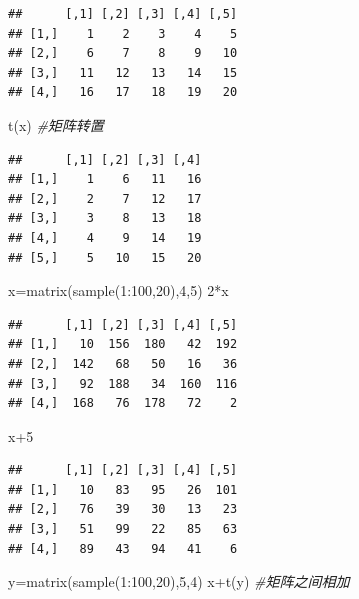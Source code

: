 \documentclass[
]{book}
\newenvironment{Shaded}{\begin{snugshade}}{\end{snugshade}}
\newcommand{\CommentTok}[1]{\textcolor[rgb]{0.56,0.35,0.01}{\textit{#1}}}
\newcommand{\DecValTok}[1]{\textcolor[rgb]{0.00,0.00,0.81}{#1}}
\newcommand{\FunctionTok}[1]{\textcolor[rgb]{0.00,0.00,0.00}{#1}}
\newcommand{\NormalTok}[1]{#1}
\newcommand{\OtherTok}[1]{\textcolor[rgb]{0.56,0.35,0.01}{#1}}
\newcommand{\SpecialCharTok}[1]{\textcolor[rgb]{0.00,0.00,0.00}{#1}}
\begin{document}
\begin{verbatim}
##      [,1] [,2] [,3] [,4] [,5]
## [1,]    1    2    3    4    5
## [2,]    6    7    8    9   10
## [3,]   11   12   13   14   15
## [4,]   16   17   18   19   20
\end{verbatim}

\begin{Shaded}
\begin{Highlighting}[]
\FunctionTok{t}\NormalTok{(x) }\CommentTok{\#矩阵转置}
\end{Highlighting}
\end{Shaded}

\begin{verbatim}
##      [,1] [,2] [,3] [,4]
## [1,]    1    6   11   16
## [2,]    2    7   12   17
## [3,]    3    8   13   18
## [4,]    4    9   14   19
## [5,]    5   10   15   20
\end{verbatim}

\begin{Shaded}
\begin{Highlighting}[]
\NormalTok{x}\OtherTok{=}\FunctionTok{matrix}\NormalTok{(}\FunctionTok{sample}\NormalTok{(}\DecValTok{1}\SpecialCharTok{:}\DecValTok{100}\NormalTok{,}\DecValTok{20}\NormalTok{),}\DecValTok{4}\NormalTok{,}\DecValTok{5}\NormalTok{)}
\DecValTok{2}\SpecialCharTok{*}\NormalTok{x}
\end{Highlighting}
\end{Shaded}

\begin{verbatim}
##      [,1] [,2] [,3] [,4] [,5]
## [1,]   10  156  180   42  192
## [2,]  142   68   50   16   36
## [3,]   92  188   34  160  116
## [4,]  168   76  178   72    2
\end{verbatim}

\begin{Shaded}
\begin{Highlighting}[]
\NormalTok{x}\SpecialCharTok{+}\DecValTok{5}
\end{Highlighting}
\end{Shaded}

\begin{verbatim}
##      [,1] [,2] [,3] [,4] [,5]
## [1,]   10   83   95   26  101
## [2,]   76   39   30   13   23
## [3,]   51   99   22   85   63
## [4,]   89   43   94   41    6
\end{verbatim}

\begin{Shaded}
\begin{Highlighting}[]
\NormalTok{y}\OtherTok{=}\FunctionTok{matrix}\NormalTok{(}\FunctionTok{sample}\NormalTok{(}\DecValTok{1}\SpecialCharTok{:}\DecValTok{100}\NormalTok{,}\DecValTok{20}\NormalTok{),}\DecValTok{5}\NormalTok{,}\DecValTok{4}\NormalTok{)}
\NormalTok{x}\SpecialCharTok{+}\FunctionTok{t}\NormalTok{(y) }\CommentTok{\#矩阵之间相加}
\end{Highlighting}
\end{Shaded}
\end{document}
